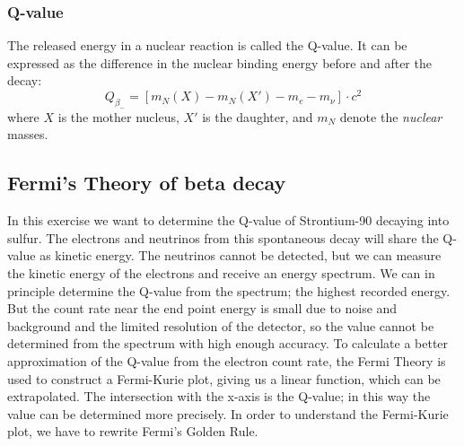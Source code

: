 \documentclass[a4,11pt, notitlepage]{article}
\begin{document}
\subsubsection{Q-value}

The released energy in a nuclear reaction is called the Q-value. It can be expressed as the difference in the nuclear binding energy before and after the decay: \begin{equation}
  Q_{\beta_-}=[m_{N}(X)-m_{N}(X')-m_e-m_{\nu}]\cdot c^2
\end{equation}
where $X$ is the mother nucleus, $X'$ is the daughter, and $m_N$
denote the \textit{nuclear} masses. 


%
%
%


\subsection{Fermi's Theory of beta decay}

In this exercise we want to determine the Q-value of Strontium-90
decaying into sulfur. The electrons and neutrinos from this
spontaneous decay will share the Q-value as kinetic energy. The
neutrinos cannot be detected, but we can measure the kinetic energy of
the electrons and receive an energy spectrum. We can in principle
determine the Q-value from the spectrum; the highest recorded
energy. But the count rate near the end point energy is small due to
noise and background and the limited resolution of the detector, so
the value cannot be determined from the spectrum with high enough
accuracy. To calculate a better approximation of the Q-value from the
electron count rate, the Fermi Theory is used to construct a
Fermi-Kurie plot, giving us a linear function, which can be
extrapolated. The intersection with the x-axis is the Q-value; in this
way the value can be determined more precisely. In order to understand
the Fermi-Kurie plot, we have to rewrite Fermi's Golden Rule.
\end{document}
